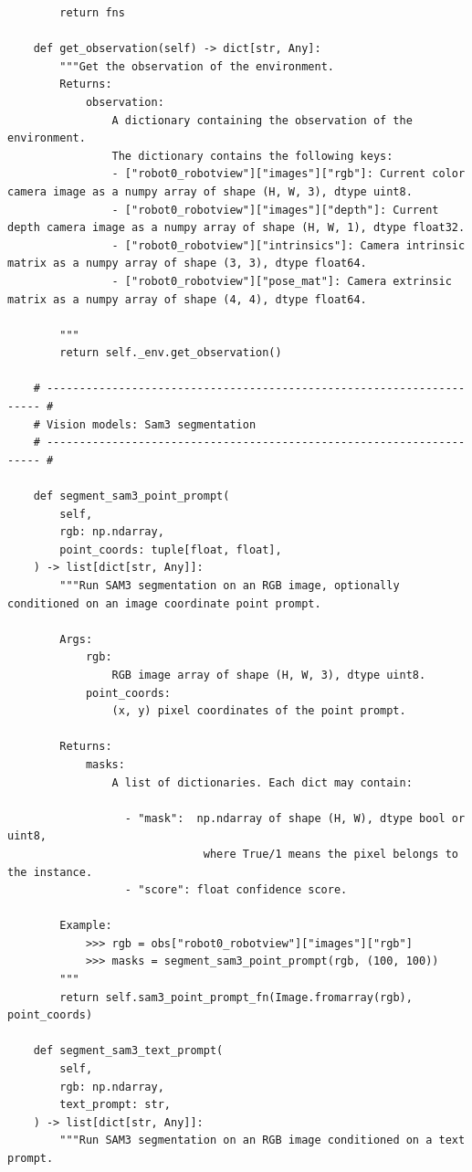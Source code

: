 \begin{lstlisting}
        return fns

    def get_observation(self) -> dict[str, Any]:
        """Get the observation of the environment.
        Returns:
            observation:
                A dictionary containing the observation of the environment.
                The dictionary contains the following keys:
                - ["robot0_robotview"]["images"]["rgb"]: Current color camera image as a numpy array of shape (H, W, 3), dtype uint8.
                - ["robot0_robotview"]["images"]["depth"]: Current depth camera image as a numpy array of shape (H, W, 1), dtype float32.
                - ["robot0_robotview"]["intrinsics"]: Camera intrinsic matrix as a numpy array of shape (3, 3), dtype float64.
                - ["robot0_robotview"]["pose_mat"]: Camera extrinsic matrix as a numpy array of shape (4, 4), dtype float64.

        """
        return self._env.get_observation()

    # --------------------------------------------------------------------- #
    # Vision models: Sam3 segmentation
    # --------------------------------------------------------------------- #

    def segment_sam3_point_prompt(
        self,
        rgb: np.ndarray,
        point_coords: tuple[float, float],
    ) -> list[dict[str, Any]]:
        """Run SAM3 segmentation on an RGB image, optionally conditioned on an image coordinate point prompt.

        Args:
            rgb:
                RGB image array of shape (H, W, 3), dtype uint8.
            point_coords:
                (x, y) pixel coordinates of the point prompt.

        Returns:
            masks:
                A list of dictionaries. Each dict may contain:

                  - "mask":  np.ndarray of shape (H, W), dtype bool or uint8,
                              where True/1 means the pixel belongs to the instance.
                  - "score": float confidence score.

        Example:
            >>> rgb = obs["robot0_robotview"]["images"]["rgb"]
            >>> masks = segment_sam3_point_prompt(rgb, (100, 100))
        """
        return self.sam3_point_prompt_fn(Image.fromarray(rgb), point_coords)

    def segment_sam3_text_prompt(
        self,
        rgb: np.ndarray,
        text_prompt: str,
    ) -> list[dict[str, Any]]:
        """Run SAM3 segmentation on an RGB image conditioned on a text prompt.


\end{lstlisting}
